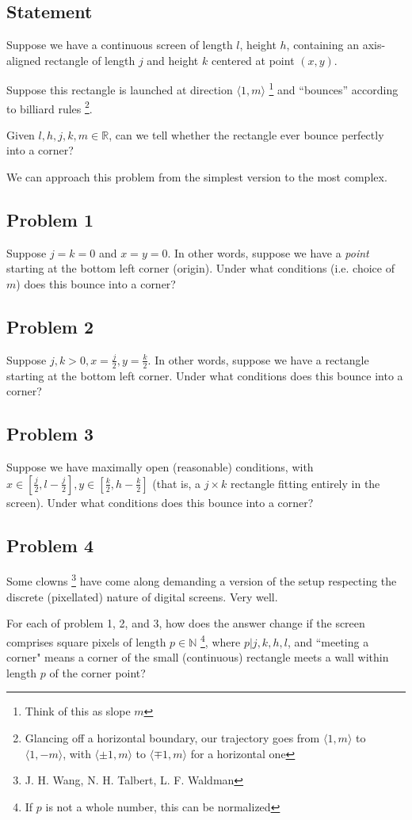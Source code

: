 \documentclass[11pt, oneside]{article} 	%
\begin{document}
\subsection{Statement} 
Suppose we have a continuous screen of length $l$, height $h$, containing an axis-aligned rectangle of length $j$ and height $k$ centered at point $(x, y)$.

Suppose this rectangle is launched at direction $\langle 1, m\rangle$ \footnote {Think of this as slope $m$} and ``bounces'' according to billiard rules \footnote{Glancing off a horizontal boundary, our trajectory goes from $\langle 1, m \rangle$ to $\langle 1, -m \rangle$, with $\langle \pm 1, m \rangle$ to $\langle \mp 1, m \rangle$ for a horizontal one}.

Given $l, h, j, k, m \in \mathbb{R}$, can we tell whether the rectangle ever bounce perfectly into a corner?  

We can approach this problem from the simplest version to the most complex.

\subsection{Problem 1} 

Suppose $j = k = 0$ and $x = y = 0$. In other words, suppose we have a \emph{point} starting at the bottom left corner
 (origin). Under what conditions (i.e. choice of $m$) does this bounce into a corner?


\subsection{Problem 2} 

Suppose $j, k > 0, x = \frac{j}{2}, y = \frac{k}{2}$. In other words, suppose we have a rectangle starting at the bottom left corner. Under what conditions does this bounce into a corner?

\subsection{Problem 3} 

Suppose we have maximally open (reasonable) conditions, with $x \in [\frac{j}{2}, l - \frac{j}{2}], y \in [\frac{k}{2}, h - \frac{k}{2}]$ (that is, a $j \times k$ rectangle fitting entirely in the screen). Under what conditions does this bounce into a corner?


\subsection{Problem 4} 

Some clowns \footnote {J. H. Wang, N. H. Talbert, L. F. Waldman} have come along demanding a version of the setup respecting the discrete (pixellated) nature of digital screens.  Very well.

For each of problem 1, 2, and 3, how does the answer change if the screen comprises square pixels of length $p \in \mathbb{N}$ \footnote{If $p$ is not a whole number, this can be normalized}, where $p | j, k, h, l$, and ``meeting a corner" means a corner of the small (continuous) rectangle meets a wall within length $p$ of the corner point?
\end{document}
